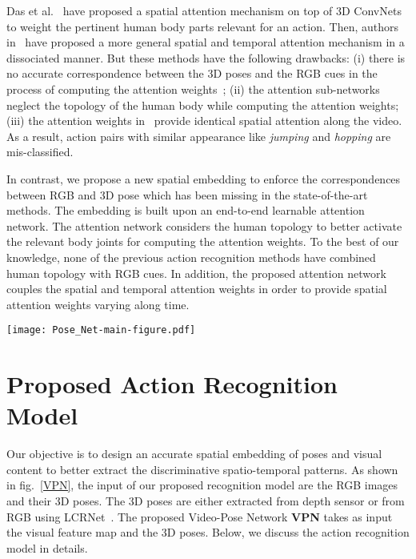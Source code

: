 \documentclass[runningheads]{llncs}
\begin{document}
Das et al.~\cite{spatial-i3d} have proposed a spatial attention mechanism on top of 3D ConvNets to weight the pertinent human body parts relevant for an action. Then, authors in~\cite{STA_iccv} have proposed a more general spatial and temporal attention mechanism in a dissociated manner. 
But these methods have the following drawbacks: (i) there is no accurate correspondence between the 3D poses and the RGB cues in the process of computing the attention weights~\cite{STA-hands,Baradel_BMVC,glimpse,spatial-i3d,STA_iccv};
(ii) the attention sub-networks~\cite{STA-hands,Baradel_BMVC,glimpse,spatial-i3d,STA_iccv} neglect the topology of the human body while computing the attention weights;
(iii) the attention weights in~\cite{spatial-i3d,STA_iccv} provide identical spatial attention along the video. As a result, action pairs with similar appearance like \textit{jumping} and \textit{hopping} are mis-classified.

In contrast, we propose a new spatial embedding to enforce the correspondences between RGB and 3D pose which has been missing in the state-of-the-art methods. The embedding is built upon an end-to-end learnable attention network. The attention network considers the human topology to better activate the relevant body joints for computing the attention weights. To the best of our knowledge, none of the previous action recognition methods have combined human topology with RGB cues. In addition, the proposed attention network couples the spatial and temporal attention weights in order to provide spatial attention weights varying along time. 



\begin{figure*}
\centering
\texttt{[image: Pose\_Net-main-figure.pdf]}
\caption{\textbf{Proposed Action Recognition Model}: Our model takes as input RGB images with their corresponding 3D poses. The RGB images are processed by a visual backbone which generates a spatio-temporal feature map (). The proposed \textbf{VPN} takes as input the feature map () and the 3D poses (). VPN consists of two components: an attention network and a spatial embedding. The attention network further consists of a Pose Backbone and a spatio-temporal Coupler. VPN computes a modulated feature map . This modulated feature map  is then used for classification. }\vspace{-0.1em}
\label{VPN}
\end{figure*}

\section{Proposed Action Recognition Model}
Our objective is to design an accurate spatial embedding of poses and visual content to better extract the discriminative spatio-temporal patterns. As shown in fig.~\ref{VPN}, the input of our proposed recognition model are the RGB images and their 3D poses. The 3D poses are either extracted from depth sensor or from RGB using LCRNet~\cite{lcrnet_new}.  The proposed Video-Pose Network \textbf{VPN} takes as input the visual feature map and the 3D poses. Below, we discuss the action recognition model in details.
\end{document}
